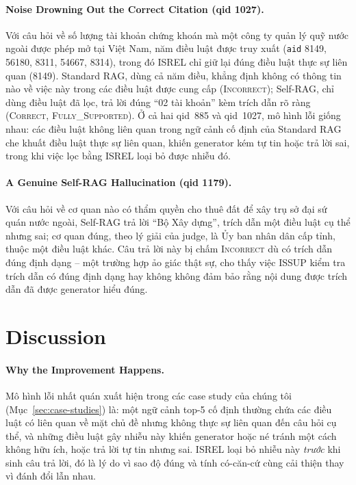 \documentclass[11pt]{article}
\begin{document}
\paragraph{Noise Drowning Out the Correct Citation (qid 1027).} Với câu hỏi về số lượng tài khoản chứng khoán mà một công ty quản lý quỹ nước ngoài được phép mở tại Việt Nam, năm điều luật được truy xuất (\texttt{aid} 8149, 56180, 8311, 54667, 8314), trong đó \textsc{ISREL} chỉ giữ lại đúng điều luật thực sự liên quan (8149). Standard RAG, dùng cả năm điều, khẳng định không có thông tin nào về việc này trong các điều luật được cung cấp (\textsc{Incorrect}); Self-RAG, chỉ dùng điều luật đã lọc, trả lời đúng ``02 tài khoản'' kèm trích dẫn rõ ràng (\textsc{Correct}, \textsc{Fully\_Supported}). Ở cả hai qid~885 và qid~1027, mô hình lỗi giống nhau: các điều luật không liên quan trong ngữ cảnh cố định của Standard RAG che khuất điều luật thực sự liên quan, khiến generator kém tự tin hoặc trả lời sai, trong khi việc lọc bằng \textsc{ISREL} loại bỏ được nhiễu đó.

\paragraph{A Genuine Self-RAG Hallucination (qid 1179).} Với câu hỏi về cơ quan nào có thẩm quyền cho thuê đất để xây trụ sở đại sứ quán nước ngoài, Self-RAG trả lời ``Bộ Xây dựng'', trích dẫn một điều luật cụ thể nhưng sai; cơ quan đúng, theo lý giải của judge, là Ủy ban nhân dân cấp tỉnh, thuộc một điều luật khác. Câu trả lời này bị chấm \textsc{Incorrect} dù có trích dẫn đúng định dạng -- một trường hợp ảo giác thật sự, cho thấy việc \textsc{ISSUP} kiểm tra trích dẫn có đúng định dạng hay không không đảm bảo rằng nội dung được trích dẫn đã được generator hiểu đúng.

\section{Discussion}
\label{sec:discussion}

\paragraph{Why the Improvement Happens.} Mô hình lỗi nhất quán xuất hiện trong các case study của chúng tôi (Mục~\ref{sec:case-studies}) là: một ngữ cảnh top-5 cố định thường chứa các điều luật có liên quan về mặt chủ đề nhưng không thực sự liên quan đến câu hỏi cụ thể, và những điều luật gây nhiễu này khiến generator hoặc né tránh một cách không hữu ích, hoặc trả lời tự tin nhưng sai. \textsc{ISREL} loại bỏ nhiễu này \emph{trước} khi sinh câu trả lời, đó là lý do vì sao độ đúng và tính có-căn-cứ cùng cải thiện thay vì đánh đổi lẫn nhau.
\end{document}
